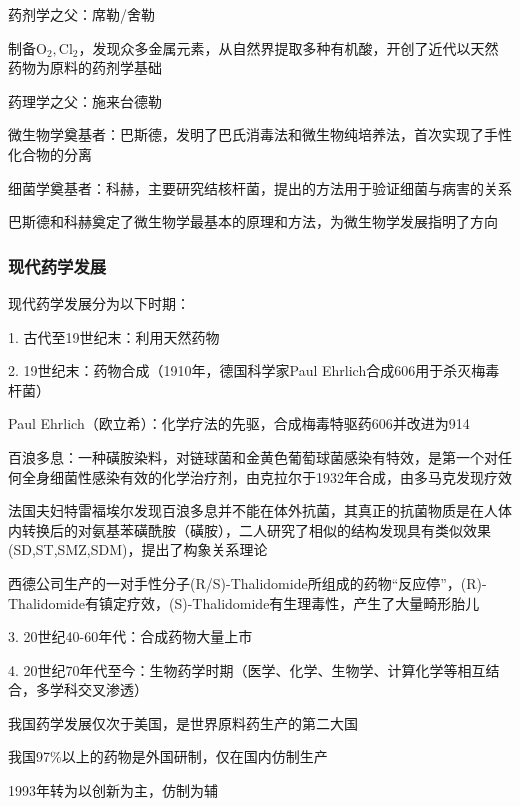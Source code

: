 \begin{notation}
    药剂学之父：席勒/舍勒

    制备$\text{O}_2,\text{Cl}_2$，发现众多金属元素，从自然界提取多种有机酸，开创了近代以天然药物为原料的药剂学基础
\end{notation}
\begin{notation}
    药理学之父：施来台德勒

    微生物学奠基者：巴斯德，发明了巴氏消毒法和微生物纯培养法，首次实现了手性化合物的分离

    细菌学奠基者：科赫，主要研究结核杆菌，提出的方法用于验证细菌与病害的关系

    巴斯德和科赫奠定了微生物学最基本的原理和方法，为微生物学发展指明了方向
\end{notation}
\subsubsection{现代药学发展}%
\label{subsub:现代药学发展}
现代药学发展分为以下时期：

1. 古代至19世纪末：利用天然药物

2. 19世纪末：药物合成（1910年，德国科学家Paul Ehrlich合成606用于杀灭梅毒杆菌）
\begin{notation}
    Paul Ehrlich（欧立希）：化学疗法的先驱，合成梅毒特驱药606并改进为914
\end{notation}
\begin{notation}
    百浪多息：一种磺胺染料，对链球菌和金黄色葡萄球菌感染有特效，是第一个对任何全身细菌性感染有效的化学治疗剂，由克拉尔于1932年合成，由多马克发现疗效
\end{notation}
\begin{notation}
    法国夫妇特雷福埃尔发现百浪多息并不能在体外抗菌，其真正的抗菌物质是在人体内转换后的对氨基苯磺酰胺（磺胺），二人研究了相似的结构发现具有类似效果(SD,ST,SMZ,SDM)，提出了构象关系理论
\end{notation}
\begin{notation}
    西德公司生产的一对手性分子(R/S)-Thalidomide所组成的药物“反应停”，(R)-Thalidomide有镇定疗效，(S)-Thalidomide有生理毒性，产生了大量畸形胎儿
\end{notation}
3. 20世纪40-60年代：合成药物大量上市

4. 20世纪70年代至今：生物药学时期（医学、化学、生物学、计算化学等相互结合，多学科交叉渗透）
\begin{notation}
    我国药学发展仅次于美国，是世界原料药生产的第二大国

    我国97\%以上的药物是外国研制，仅在国内仿制生产

    1993年转为以创新为主，仿制为辅
\end{notation}
